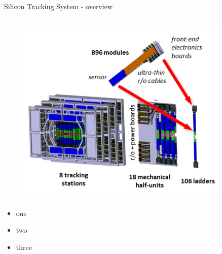\begin{columnframe}{Silicon Tracking System - overview}
    \begin{column}{0.5\textwidth}
        \begin{figure}
            \centering
            \includegraphics[width=0.9\textwidth, frame]{images/sts_integration_model.png}
        \end{figure}
    \end{column}
    \begin{column}{0.5\textwidth}
        \begin{itemize}
            \item one
            \item two
            \item three
        \end{itemize}
    \end{column}
\end{columnframe}

